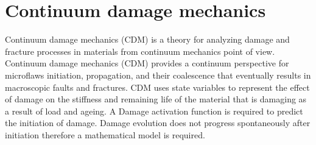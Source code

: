 \documentclass[a4paper,12pt]{article}
\begin{document}
\section{Continuum damage mechanics}
\indent\indent\indent Continuum damage mechanics (CDM) is a theory for analyzing damage and fracture processes in materials from continuum mechanics point of view. Continuum damage mechanics (CDM) provides a continuum perspective for microflaws initiation, propagation, and their coalescence that eventually results in macroscopic faults and fractures. CDM uses state variables to represent the effect of damage on the stiffness and remaining life of the material that is damaging as a result of load and ageing. A Damage activation function is required to predict the initiation of damage. Damage evolution does not progress spontaneously after initiation therefore a mathematical model is required.  
\end{document}
